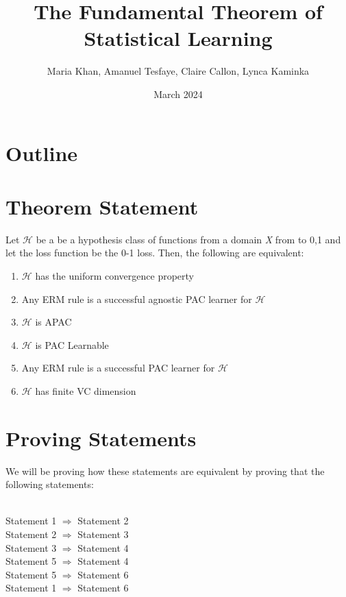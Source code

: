 \documentclass{article}
\title{The Fundamental Theorem of Statistical Learning}
\author{Maria Khan, Amanuel Tesfaye, Claire Callon, Lynca Kaminka}
\date{March 2024}
\begin{document}
\maketitle

\section*{Outline}
\section{Theorem Statement}
    


Let $\mathcal{H}$ be a be a hypothesis class of functions from a domain \textit{X} from to {0,1} and let the loss function be the 0-1 loss. Then, the following are equivalent:

\begin{enumerate}
\item $\mathcal{H}$ has the uniform convergence property
\item Any ERM rule is a successful agnostic PAC learner for $\mathcal{H}$
\item $\mathcal{H}$ is APAC
\item $\mathcal{H}$ is PAC Learnable
\item Any ERM rule is a successful PAC learner for $\mathcal{H}$
\item $\mathcal{H}$ has finite VC dimension
\end{enumerate}

\section{Proving Statements}
We will be proving how these statements are equivalent by proving that the following statements: \\
\begin{enumerate}\\
Statement 1 $\Rightarrow$ Statement 2 \\
Statement 2 $\Rightarrow$ Statement 3 \\
Statement 3 $\Rightarrow$ Statement 4 \\
Statement 5 $\Rightarrow$ Statement 4 \\
Statement 5 $\Rightarrow$ Statement 6 \\
Statement 1 $\Rightarrow$ Statement 6 \\
\end{enumerate}
\end{document}
